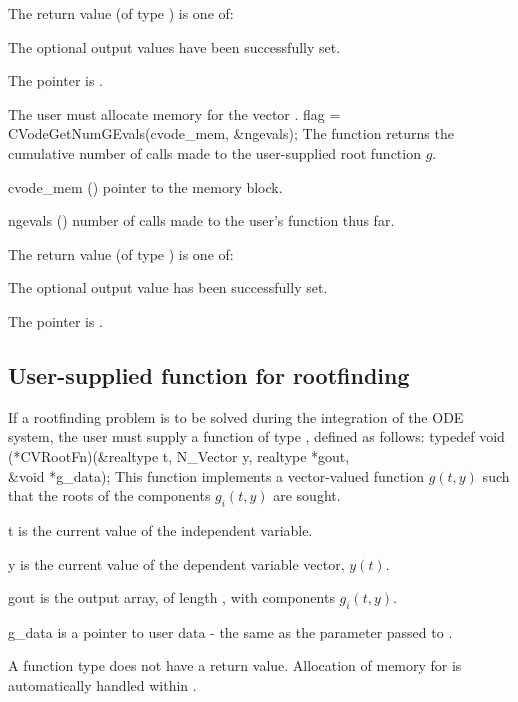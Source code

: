 {
  The return value  (of type ) is one of:
  \begin{args}
  \item[\Id{CV\_SUCCESS}] 
    The optional output values have been successfully set.
  \item[\Id{CV\_MEM\_NULL}]
    The  pointer is .
  \end{args}
}
{
  {\warn} The user must allocate memory for the vector .  
}
{
  flag = CVodeGetNumGEvals(cvode\_mem, \&ngevals);
}
{
  The function  returns the cumulative
  number of calls made to the user-supplied root function $g$.
}
{
  \begin{args}
  \item[cvode\_mem] ()
    pointer to the {\cvodes} memory block.
  \item[ngevals] ()
    number of calls made to the user's function  thus far.
  \end{args}
}
{
  The return value  (of type ) is one of:
  \begin{args}
  \item[\Id{CV\_SUCCESS}] 
    The optional output value has been successfully set.
  \item[\Id{CV\_MEM\_NULL}]
    The  pointer is .
  \end{args}
}
{}

\subsection{User-supplied function for rootfinding}\label{ss:root_us}

If a rootfinding problem is to be solved during the integration of the ODE system,
the user must supply a {\C} function of type , defined as follows:
{
  typedef void (*CVRootFn)(&realtype t, N\_Vector y, realtype *gout, \\
                           &void *g\_data);
}
{
  This function implements a vector-valued function $g(t,y)$ such that the roots of 
  the  components $g_i(t,y)$ are sought.
}
{
  \begin{args}[g\_data]
  \item[t]
    is the current value of the independent variable.
  \item[y]
    is the current value of the dependent variable vector, $y(t)$.
  \item[gout]
    is the output array, of length , with components $g_i(t,y)$.
  \item[g\_data]
    is a pointer to user data - the same as the       
    parameter passed to .   
  \end{args}
}
{
  A  function type does not have a return value.                        
}
{
  Allocation of memory for  is automatically handled within {\cvodes}.
}

